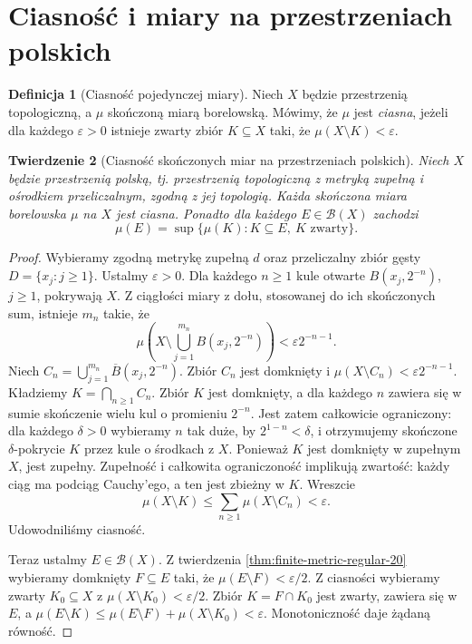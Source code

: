 \documentclass[11pt,a4paper,oneside]{book}
\numberwithin{equation}{chapter}
\theoremstyle{plain}
\newtheorem{twierdzenie}{Twierdzenie}[chapter]
\theoremstyle{definition}
\newtheorem{definicja}[twierdzenie]{Definicja}
\theoremstyle{remark}
\begin{document}
\section{Ciasność i miary na przestrzeniach polskich}
\begin{definicja}[Ciasność pojedynczej miary]
\label{def:tight-single-20}
Niech $X$ będzie przestrzenią topologiczną, a $\mu$
skończoną miarą borelowską. Mówimy, że $\mu$ jest
\emph{ciasna}, jeżeli dla każdego $\varepsilon>0$
istnieje zwarty zbiór $K\subseteq X$ taki,
że $\mu(X\setminus K)<\varepsilon$.
\end{definicja}

\begin{twierdzenie}[Ciasność skończonych miar na przestrzeniach polskich]
\label{thm:polish-tight-20}
Niech $X$ będzie przestrzenią polską, tj. przestrzenią
topologiczną z metryką zupełną i ośrodkiem przeliczalnym,
zgodną z jej topologią. Każda skończona miara borelowska
$\mu$ na $X$ jest ciasna. Ponadto dla każdego
$E\in\mathcal B(X)$ zachodzi
\[
 \mu(E)=\sup\{\mu(K):K\subseteq E,\ K\text{ zwarty}\}.
\]
\end{twierdzenie}
\begin{proof}
Wybieramy zgodną metrykę zupełną $d$ oraz przeliczalny
zbiór gęsty $D=\{x_j:j\ge1\}$. Ustalmy $\varepsilon>0$.
Dla każdego $n\ge1$ kule otwarte
$B(x_j,2^{-n})$, $j\ge1$, pokrywają $X$.
Z ciągłości miary z dołu, stosowanej do ich skończonych
sum, istnieje $m_n$ takie, że
\[
\mu\left(X\setminus\bigcup_{j=1}^{m_n}B(x_j,2^{-n})\right)
<\varepsilon 2^{-n-1}.
\]
Niech $C_n=\bigcup_{j=1}^{m_n}\overline{B}(x_j,2^{-n})$.
Zbiór $C_n$ jest domknięty i
$\mu(X\setminus C_n)<\varepsilon2^{-n-1}$.
Kładziemy $K=\bigcap_{n\ge1}C_n$.
Zbiór $K$ jest domknięty, a dla każdego $n$
zawiera się w sumie skończenie wielu kul o promieniu
$2^{-n}$. Jest zatem całkowicie ograniczony:
dla każdego $\delta>0$ wybieramy $n$ tak duże,
by $2^{1-n}<\delta$, i otrzymujemy skończone
$\delta$-pokrycie $K$ przez kule o środkach z $X$.
Ponieważ $K$ jest domknięty w zupełnym $X$, jest zupełny.
Zupełność i całkowita ograniczoność implikują zwartość:
każdy ciąg ma podciąg Cauchy'ego, a ten jest zbieżny
w $K$. Wreszcie
\[
 \mu(X\setminus K)
 \le\sum_{n\ge1}\mu(X\setminus C_n)<\varepsilon.
\]
Udowodniliśmy ciasność.

Teraz ustalmy $E\in\mathcal B(X)$. Z twierdzenia
\ref{thm:finite-metric-regular-20} wybieramy domknięty
$F\subseteq E$ taki, że $\mu(E\setminus F)<\varepsilon/2$.
Z ciasności wybieramy zwarty $K_0\subseteq X$
z $\mu(X\setminus K_0)<\varepsilon/2$.
Zbiór $K=F\cap K_0$ jest zwarty, zawiera się w $E$, a
$\mu(E\setminus K)\le\mu(E\setminus F)+\mu(X\setminus K_0)
<\varepsilon$. Monotoniczność daje żądaną równość.
\end{proof}
\end{document}
